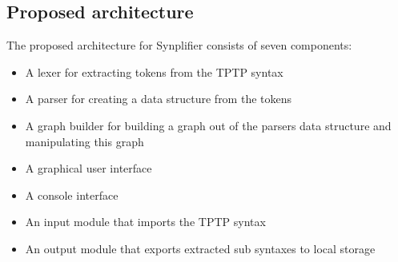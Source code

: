 \subsection{Proposed architecture}\label{sec:ConceptProposedArchitecture}
The proposed architecture for \ac{Synplifier} consists of seven components:
\begin{itemize}
\item A lexer for extracting tokens from the \ac{TPTP} syntax
\item A parser for creating a data structure from the tokens
\item A graph builder for building a graph out of the parsers data structure and manipulating this graph
\item A graphical user interface
\item A console interface 
\item An input module that imports the \ac{TPTP} syntax
\item An output module that exports extracted sub syntaxes to local storage
\end{itemize}


